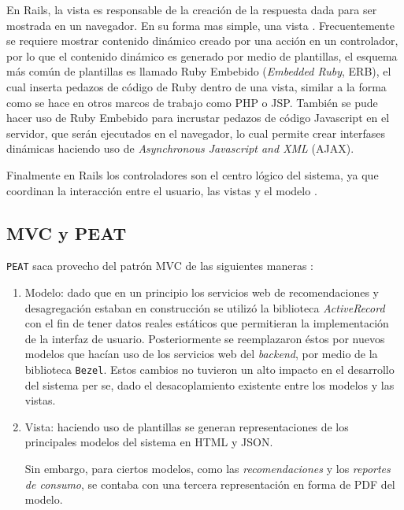En Rails, la vista es responsable de la creación de la respuesta dada para
ser mostrada en un navegador. En su forma mas simple, una
vista  \cite{15_agile_hansson}.
Frecuentemente se requiere mostrar contenido dinámico creado por una acción en un
controlador, por lo que el contenido dinámico es generado por medio de plantillas,
el esquema más común de plantillas es llamado Ruby Embebido (\textit{Embedded Ruby},
ERB), el cual inserta pedazos de código de Ruby dentro de una vista, similar a la
forma como se hace en otros marcos de trabajo como PHP o JSP. También se pude hacer
uso de Ruby Embebido para incrustar pedazos de código Javascript en el servidor,
que serán ejecutados en el navegador, lo cual permite crear interfases
dinámicas haciendo uso de \textit{Asynchronous Javascript and XML} (AJAX).

Finalmente en Rails los controladores son el centro lógico del sistema, ya que
coordinan la interacción entre el usuario, las vistas y el modelo
\cite{15_agile_hansson}.

\subsection{MVC y PEAT}
\texttt{PEAT} saca provecho del patrón MVC de las siguientes maneras \cite{15_agile_hansson}:

\begin{enumerate}
\item Modelo: dado que en un principio los servicios web de recomendaciones y
  desa\-gregación estaban en construcción se utilizó la biblioteca
  \textit{ActiveRecord} con el fin de tener datos reales estáticos que
  permitieran la implementación de la interfaz de usuario.
  Posteriormente se reemplazaron éstos por nuevos modelos que hacían
  uso de los servicios web del \textit{backend}, por medio de la biblioteca
  \texttt{Bezel}.
  Estos cambios no tuvieron un alto impacto en el desarrollo del sistema per se,
  dado el desacoplamiento existente entre los modelos y las vistas.
\item Vista: haciendo uso de plantillas se generan representaciones de los
  principales modelos del sistema en HTML y JSON.

  Sin embargo, para ciertos modelos, como las \textit{recomendaciones} y los
  \textit{reportes de consumo}, se contaba con una tercera representación en forma
  de PDF del modelo.
\end{enumerate}

